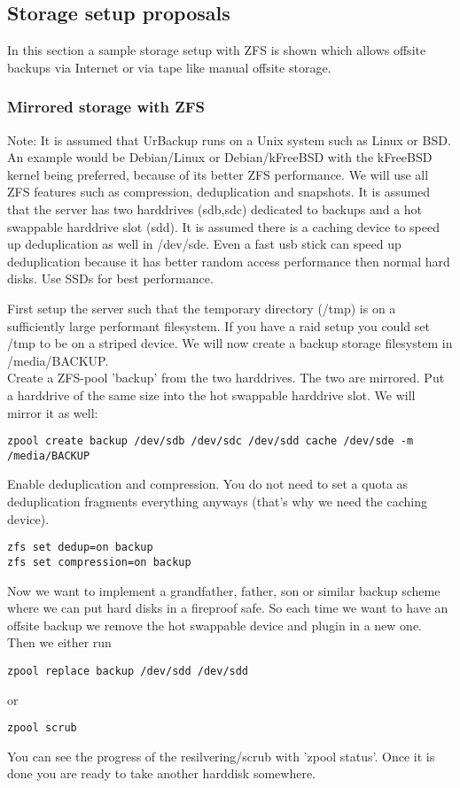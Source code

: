 \documentclass[a4paper,10pt]{article}
\begin{document}
\subsection{Storage setup proposals}
\label{sec_storage_proposals}

In this section a sample storage setup with ZFS is shown which allows offsite backups via Internet or via tape like manual offsite storage.

\subsubsection{Mirrored storage with ZFS}
\label{subsec_ZFS_setup}

Note: It is assumed that UrBackup runs on a Unix system such as Linux or BSD. An example would be Debian/Linux or Debian/kFreeBSD with the kFreeBSD kernel being preferred, because of its better ZFS performance. We will use all ZFS features such as compression, deduplication and snapshots. It is assumed that the server has two harddrives (sdb,sdc) dedicated to backups and a hot swappable harddrive slot (sdd). It is assumed there is a caching device to speed up deduplication as well in /dev/sde. Even a fast usb stick can speed up deduplication because it has better random access performance then normal hard disks. Use SSDs for best performance. 

First setup the server such that the temporary directory (/tmp) is on a sufficiently large performant filesystem. If you have a raid setup you could set /tmp to be on a striped device. We will now create a backup storage filesystem in /media/BACKUP.\\
Create a ZFS-pool 'backup' from the two harddrives. The two are mirrored. Put a harddrive of the same size into the hot swappable harddrive slot. We will mirror it as well:
\begin{verbatim}
zpool create backup /dev/sdb /dev/sdc /dev/sdd cache /dev/sde -m /media/BACKUP
\end{verbatim}
Enable deduplication and compression. You do not need to set a quota as deduplication fragments everything anyways (that's why we need the caching device).
\begin{verbatim}
zfs set dedup=on backup
zfs set compression=on backup
\end{verbatim}
Now we want to implement a grandfather, father, son or similar backup scheme where we can put hard disks in a fireproof safe. So each time we want to have an offsite backup we remove the hot swappable device and plugin in a new one. Then we either run
\begin{verbatim}
zpool replace backup /dev/sdd /dev/sdd
\end{verbatim}
or
\begin{verbatim}
zpool scrub
\end{verbatim}
You can see the progress of the resilvering/scrub with 'zpool status'. Once it is done you are ready to take another harddisk somewhere.
\end{document}
